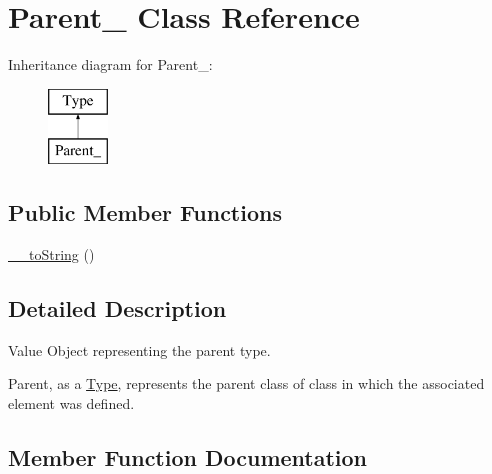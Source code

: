 \hypertarget{classphp_documentor_1_1_reflection_1_1_types_1_1_parent__}{}\section{Parent\+\_\+ Class Reference}
\label{classphp_documentor_1_1_reflection_1_1_types_1_1_parent__}
Inheritance diagram for Parent\+\_\+\+:\begin{figure}[H]
\begin{center}
\leavevmode
\includegraphics[height=2.000000cm]{classphp_documentor_1_1_reflection_1_1_types_1_1_parent__}
\end{center}
\end{figure}
\subsection*{Public Member Functions}
\begin{DoxyCompactItemize}
\item 
\mbox{\hyperlink{classphp_documentor_1_1_reflection_1_1_types_1_1_parent___a7516ca30af0db3cdbf9a7739b48ce91d}{\+\_\+\+\_\+to\+String}} ()
\end{DoxyCompactItemize}


\subsection{Detailed Description}
Value Object representing the \textquotesingle{}parent\textquotesingle{} type.

Parent, as a \mbox{\hyperlink{interfacephp_documentor_1_1_reflection_1_1_type}{Type}}, represents the parent class of class in which the associated element was defined. 

\subsection{Member Function Documentation}
\mbox{\label{classphp_documentor_1_1_reflection_1_1_types_1_1_parent___a7516ca30af0db3cdbf9a7739b48ce91d}} 
